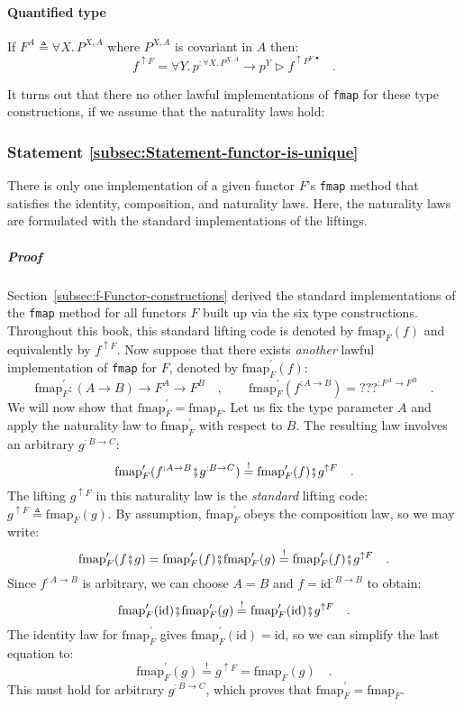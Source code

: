 \paragraph{Quantified type}

If $F^{A}\triangleq\forall X.\,P^{X,A}$ where $P^{X,A}$ is covariant
in $A$ then: 
\[
f^{\uparrow F}=\forall Y.\,p^{:\forall X.\,P^{X,A}}\rightarrow p^{Y}\triangleright f^{\uparrow P^{Y,\bullet}}\quad.
\]

It turns out that there no other lawful implementations of \lstinline!fmap!
for these type constructions, if we assume that the naturality laws
hold:

\subsubsection{Statement \label{subsec:Statement-functor-is-unique}\ref{subsec:Statement-functor-is-unique}}

There is only one implementation of a given functor $F$\textsf{'}s \lstinline!fmap!
method that satisfies the identity, composition, and naturality laws.
Here, the naturality laws are formulated with the standard implementations
of the liftings.

\subparagraph{Proof}

Section~\ref{subsec:f-Functor-constructions} derived the standard
implementations of the \lstinline!fmap! method for all functors $F$
built up via the six type constructions. Throughout this book, this
standard lifting code is denoted by $\text{fmap}_{F}(f)$ and equivalently
by $f^{\uparrow F}$. Now suppose that there exists \emph{another}
lawful implementation of \lstinline!fmap! for $F$, denoted by $\text{fmap}_{F}^{\prime}(f)$:
\[
\text{fmap}_{F}^{\prime}:\left(A\rightarrow B\right)\rightarrow F^{A}\rightarrow F^{B}\quad,\quad\quad\text{fmap}_{F}^{\prime}(f^{:A\rightarrow B})=\text{???}^{:F^{A}\rightarrow F^{B}}\quad.
\]
We will now show that $\text{fmap}_{F}^{\prime}=\text{fmap}_{F}$.
Let us fix the type parameter $A$ and apply the naturality law to
$\text{fmap}_{F}^{\prime}$ with respect to $B$. The resulting law
involves an arbitrary $g^{:B\rightarrow C}$:
\[
\text{fmap}_{F}^{\prime}(f^{:A\rightarrow B}\bef g^{:B\rightarrow C})\overset{!}{=}\text{fmap}_{F}^{\prime}(f)\bef g^{\uparrow F}\quad.
\]
The lifting $g^{\uparrow F}$ in this naturality law is the \emph{standard}
lifting code: $g^{\uparrow F}\triangleq\text{fmap}_{F}(g)$. By assumption,
$\text{fmap}_{F}^{\prime}$ obeys the composition law, so we may write:
\[
\text{fmap}_{F}^{\prime}(f\bef g)=\text{fmap}_{F}^{\prime}(f)\bef\text{fmap}_{F}^{\prime}(g)\overset{!}{=}\text{fmap}_{F}^{\prime}(f)\bef g^{\uparrow F}\quad.
\]
Since $f^{:A\rightarrow B}$ is arbitrary, we can choose $A=B$ and
$f=\text{id}^{:B\rightarrow B}$ to obtain:
\[
\text{fmap}_{F}^{\prime}(\text{id})\bef\text{fmap}_{F}^{\prime}(g)\overset{!}{=}\text{fmap}_{F}^{\prime}(\text{id})\bef g^{\uparrow F}\quad.
\]
The identity law for $\text{fmap}_{F}^{\prime}$ gives $\text{fmap}_{F}^{\prime}(\text{id})=\text{id}$,
so we can simplify the last equation to:
\[
\text{fmap}_{F}^{\prime}(g)\overset{!}{=}g^{\uparrow F}=\text{fmap}_{F}(g)\quad.
\]
This must hold for arbitrary $g^{:B\rightarrow C}$, which proves
that $\text{fmap}_{F}^{\prime}=\text{fmap}_{F}$.

